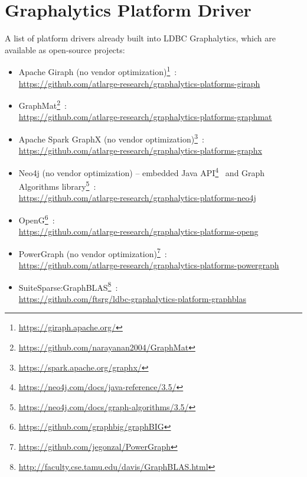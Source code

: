 \section{Graphalytics Platform Driver}\label{sec:instructions:drivers}
A list of platform drivers already built into LDBC Graphalytics, which are available as open-source projects:

\begin{itemize}
	\item Apache Giraph (no vendor optimization)\footnote{\url{https://giraph.apache.org/}}~\cite{DBLP:books/sp/SOAK2016}: \\ \url{https://github.com/atlarge-research/graphalytics-platforms-giraph}
	\item GraphMat\footnote{\url{https://github.com/narayanan2004/GraphMat}}~\cite{DBLP:journals/pvldb/SundaramSPDAV0D15}: \\ \url{https://github.com/atlarge-research/graphalytics-platforms-graphmat}
	\item Apache Spark GraphX (no vendor optimization)\footnote{\url{https://spark.apache.org/graphx/}}~\cite{DBLP:conf/sigmod/XinGFS13}: \\ \url{https://github.com/atlarge-research/graphalytics-platforms-graphx}
	\item Neo4j (no vendor optimization) --
	embedded Java API\footnote{\url{https://neo4j.com/docs/java-reference/3.5/}}~\cite{GraphDatabases} and
	Graph Algorithms library\footnote{\url{https://neo4j.com/docs/graph-algorithms/3.5/}}~\cite{	graph_algorithms_book}: \\ \url{https://github.com/atlarge-research/graphalytics-platforms-neo4j}
	\item OpenG\footnote{\url{https://github.com/graphbig/graphBIG}}~\cite{DBLP:conf/sc/NaiXTKL15}: \\ \url{https://github.com/atlarge-research/graphalytics-platforms-openg}
	\item PowerGraph (no vendor optimization)\footnote{\url{https://github.com/jegonzal/PowerGraph}}~\cite{DBLP:conf/osdi/GonzalezXDCFS14}: \\ \url{https://github.com/atlarge-research/graphalytics-platforms-powergraph}
	\item SuiteSparse:GraphBLAS\footnote{\url{http://faculty.cse.tamu.edu/davis/GraphBLAS.html}}~\cite{DBLP:journals/toms/Davis19}: \\ \url{https://github.com/ftsrg/ldbc-graphalytics-platform-graphblas}
\end{itemize}

